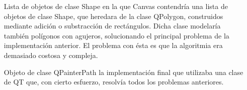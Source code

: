 \begin{enumerate}
\begin{itemize}
	\end{itemize}
	\item[Lista de objetos de clase Shape] en la que Canvas contendría una lista de objetos de clase Shape, que heredara de la clase QPolygon, construidos mediante adición o substracción de rectángulos. Dicha clase modelaría también polígonos con agujeros, solucionando el principal problema de la implementación anterior.
	El problema con ésta es que la algoritmia era demasiado costosa y compleja.
	\item[Objeto de clase QPainterPath] la implementación final que utilizaba una clase de QT que, con cierto esfuerzo, resolvía todos los problemas anteriores.
\end{enumerate}
